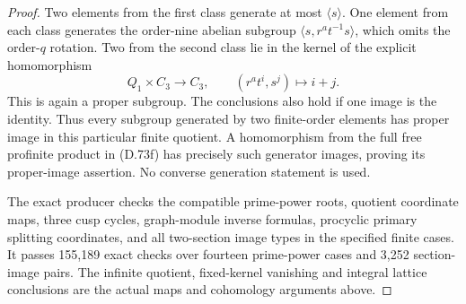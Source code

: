 \begin{proof}
Two elements from the first class generate at most
\(\langle s\rangle\).
One element from each class generates the order-nine
abelian subgroup
\(\langle s,r^a t^{-1}s\rangle\), which omits the
order-\(q\) rotation.
Two from the second class lie in the kernel of
the explicit homomorphism
\[
 Q_1\times C_3\longrightarrow C_3,\qquad
                       (r^a t^i,s^j)\longmapsto i+j .
                                                               \tag{D.73x}
\]
This is again a proper subgroup. The conclusions
also hold if one image is the identity.
Thus every subgroup generated by two finite-order
elements has proper image in this particular
finite quotient. A homomorphism from the full
free profinite product in (D.73f) has precisely
such generator images, proving its proper-image
assertion. No converse generation statement is used.

The exact producer
checks the compatible prime-power roots, quotient
coordinate maps, three cusp cycles, graph-module
inverse formulas, procyclic primary splitting
coordinates, and all two-section image types in
the specified finite cases.
It passes 155,189 exact checks over fourteen
prime-power cases and 3,252 section-image pairs.
The infinite quotient, fixed-kernel vanishing
and integral lattice conclusions are the actual
maps and cohomology arguments above.
\end{proof}
